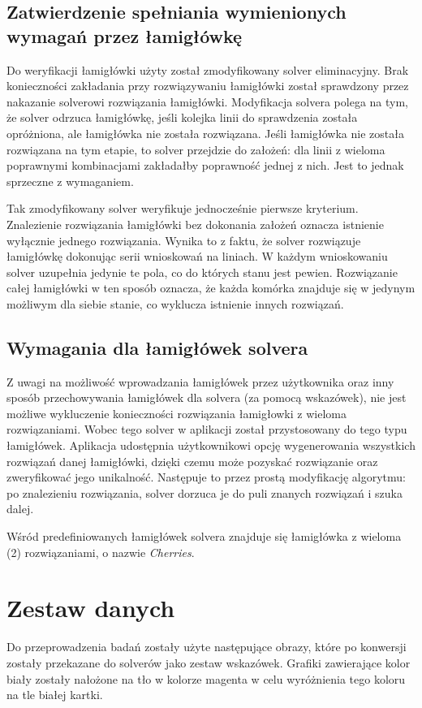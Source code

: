 \subsection{Zatwierdzenie spełniania wymienionych wymagań przez łamigłówkę}
    Do weryfikacji łamigłówki użyty został zmodyfikowany solver eliminacyjny. Brak konieczności
zakładania przy rozwiązywaniu łamigłówki został sprawdzony przez nakazanie solverowi rozwiązania
łamigłówki. Modyfikacja solvera polega na tym, że solver odrzuca łamigłówkę, jeśli kolejka linii do
sprawdzenia została opróżniona, ale łamigłówka nie została rozwiązana. Jeśli łamigłówka nie została
rozwiązana na tym etapie, to solver przejdzie do założeń: dla linii z wieloma poprawnymi
kombinacjami zakładałby poprawność jednej z nich. Jest to jednak sprzeczne z wymaganiem.

    Tak zmodyfikowany solver weryfikuje jednocześnie pierwsze kryterium. Znalezienie rozwiązania
łamigłówki bez dokonania założeń oznacza istnienie wyłącznie jednego rozwiązania. Wynika to z faktu,
że solver rozwiązuje łamigłówkę dokonując serii wnioskowań na liniach. W każdym wnioskowaniu solver
uzupełnia jedynie te pola, co do których stanu jest pewien. Rozwiązanie całej łamigłówki w ten sposób
oznacza, że każda komórka znajduje się w jedynym możliwym dla siebie stanie, co wyklucza istnienie
innych rozwiązań.


\subsection{Wymagania dla łamigłówek solvera}
    Z uwagi na możliwość wprowadzania łamigłówek przez użytkownika oraz inny sposób przechowywania
łamigłówek dla solvera (za pomocą wskazówek), nie jest możliwe wykluczenie
konieczności rozwiązania łamigłowki z wieloma rozwiązaniami. Wobec tego solver w aplikacji
został przystosowany do tego typu łamigłówek. Aplikacja udostępnia użytkownikowi opcję wygenerowania
wszystkich rozwiązań danej łamigłówki, dzięki czemu może pozyskać rozwiązanie oraz zweryfikować
jego unikalność. Następuje to przez prostą modyfikację algorytmu: po znalezieniu rozwiązania, solver
dorzuca je do puli znanych rozwiązań i szuka dalej.

    Wśród predefiniowanych łamigłówek solvera znajduje się łamigłówka z wieloma (2) rozwiązaniami,
o nazwie \textit{Cherries}.



\section{Zestaw danych}
    Do przeprowadzenia badań zostały użyte następujące obrazy, które po konwersji zostały przekazane do solverów
jako zestaw wskazówek. Grafiki zawierające kolor biały zostały nałożone na tło w kolorze magenta
w celu wyróżnienia tego koloru na tle białej kartki.


